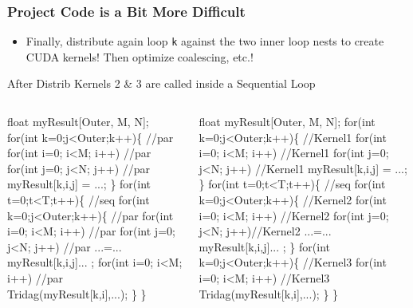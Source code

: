 \documentclass{beamer}
\newcommand{\emp}[1]{\textcolor{DikuRed}{ #1}}
\newcommand{\emphh}[1]{\textcolor{CosGreen}{ #1}}
\begin{document}
\begin{frame}[fragile,t]
  \frametitle{Project Code is a Bit More Difficult} %

\begin{itemize}
    \item Finally, distribute again loop {\tt k} against the
            two inner loop nests to create CUDA kernels!
          Then optimize coalescing, etc.!
\end{itemize}

\begin{block}{After Distrib Kernels 2 \& 3 are called inside a Sequential Loop}
\begin{columns}
\begin{colorcode}
float myResult[Outer, M, N];
\emphh{for(int k=0;j<Outer;k++)\{ //par}
  \emphh{for(int i=0; i<M; i++) //par}
    \emphh{for(int j=0; j<N; j++) //par}
      \emp{myResult[k,i,j] = ...;}
\}
\emp{for(int t=0;t<T;t++)\{ //seq}
  \emphh{for(int k=0;j<Outer;k++)\{ //par}
    \emphh{for(int i=0; i<M; i++) //par}
      \emphh{for(int j=0; j<N; j++) //par}
        ...=...\emp{myResult[k,i,j]}... ;
    \emphh{for(int i=0; i<M; i++) //par}
        \emp{Tridag(myResult[k,i],...);}
\emp{\}} \emphh{\}} 
\end{colorcode}
\begin{colorcode}
float myResult[Outer, M, N];
\emphh{for(int k=0;j<Outer;k++)\{  //Kernel1}
  \emphh{for(int i=0; i<M; i++)   //Kernel1}
    \emphh{for(int j=0; j<N; j++) //Kernel1}
      \emp{myResult[k,i,j] = ...;}
\}
\emp{for(int t=0;t<T;t++)\{ //seq}
  \emphh{for(int k=0;j<Outer;k++)\{ //Kernel2}
    \emphh{for(int i=0; i<M; i++)  //Kernel2}
      \emphh{for(int j=0; j<N; j++)//Kernel2}
          ...=...\emp{myResult[k,i,j]}... ;
  \emphh{\}}
  \emphh{for(int k=0;j<Outer;k++)\{ //Kernel3}
    \emphh{for(int i=0; i<M; i++)  //Kernel3}
          \emp{Tridag(myResult[k,i],...);}
\emp{\}} \emphh{\}} 
\end{colorcode}
\end{columns}
\end{block} 

\end{frame}
\end{document}
